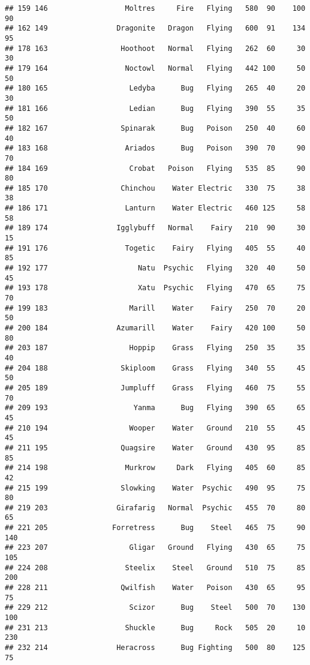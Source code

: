 \documentclass[
]{article}
\begin{document}
\begin{verbatim}
## 159 146                  Moltres     Fire   Flying   580  90    100      90
## 162 149                Dragonite   Dragon   Flying   600  91    134      95
## 178 163                 Hoothoot   Normal   Flying   262  60     30      30
## 179 164                  Noctowl   Normal   Flying   442 100     50      50
## 180 165                   Ledyba      Bug   Flying   265  40     20      30
## 181 166                   Ledian      Bug   Flying   390  55     35      50
## 182 167                 Spinarak      Bug   Poison   250  40     60      40
## 183 168                  Ariados      Bug   Poison   390  70     90      70
## 184 169                   Crobat   Poison   Flying   535  85     90      80
## 185 170                 Chinchou    Water Electric   330  75     38      38
## 186 171                  Lanturn    Water Electric   460 125     58      58
## 189 174                Igglybuff   Normal    Fairy   210  90     30      15
## 191 176                  Togetic    Fairy   Flying   405  55     40      85
## 192 177                     Natu  Psychic   Flying   320  40     50      45
## 193 178                     Xatu  Psychic   Flying   470  65     75      70
## 199 183                   Marill    Water    Fairy   250  70     20      50
## 200 184                Azumarill    Water    Fairy   420 100     50      80
## 203 187                   Hoppip    Grass   Flying   250  35     35      40
## 204 188                 Skiploom    Grass   Flying   340  55     45      50
## 205 189                 Jumpluff    Grass   Flying   460  75     55      70
## 209 193                    Yanma      Bug   Flying   390  65     65      45
## 210 194                   Wooper    Water   Ground   210  55     45      45
## 211 195                 Quagsire    Water   Ground   430  95     85      85
## 214 198                  Murkrow     Dark   Flying   405  60     85      42
## 215 199                 Slowking    Water  Psychic   490  95     75      80
## 219 203                Girafarig   Normal  Psychic   455  70     80      65
## 221 205               Forretress      Bug    Steel   465  75     90     140
## 223 207                   Gligar   Ground   Flying   430  65     75     105
## 224 208                  Steelix    Steel   Ground   510  75     85     200
## 228 211                 Qwilfish    Water   Poison   430  65     95      75
## 229 212                   Scizor      Bug    Steel   500  70    130     100
## 231 213                  Shuckle      Bug     Rock   505  20     10     230
## 232 214                Heracross      Bug Fighting   500  80    125      75

\end{verbatim}
\end{document}

